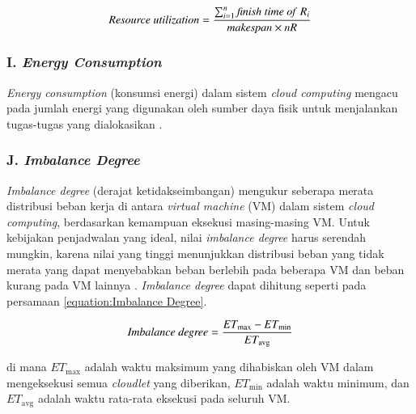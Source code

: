 \begin{equation}
\label{equation:Resource Utilization}
    \text{\textit{Resource utilization}} = \frac{\sum_{i=1}^{n} \text{\textit{finish time of} } R_i}{\text{\textit{makespan}} \times nR}
\end{equation}

\subsubsection{I. \textit{Energy Consumption}}
\textit{Energy consumption} (konsumsi energi) dalam sistem \textit{cloud computing} mengacu pada jumlah energi yang digunakan oleh sumber daya fisik untuk menjalankan tugas-tugas yang dialokasikan \parencite{Emara2021}.

\subsubsection{J. \textit{Imbalance Degree}}
\textit{Imbalance degree} (derajat ketidakseimbangan) mengukur seberapa merata distribusi beban kerja di antara \textit{virtual machine} (VM) dalam sistem \textit{cloud computing}, berdasarkan kemampuan eksekusi masing-masing VM. Untuk kebijakan penjadwalan yang ideal, nilai \textit{imbalance degree} harus serendah mungkin, karena nilai yang tinggi menunjukkan distribusi beban yang tidak merata yang dapat menyebabkan beban berlebih pada beberapa VM dan beban kurang pada VM lainnya \parencite{Tomar2022}. \textit{Imbalance degree} dapat dihitung seperti pada persamaan \ref{equation:Imbalance Degree}.

\begin{equation}
\label{equation:Imbalance Degree}
    \text{\textit{Imbalance degree}} = \frac{ET_{\max} - ET_{\min}}{ET_{\text{avg}}}
\end{equation}

di mana $ET_{\max}$ adalah waktu maksimum yang dihabiskan oleh VM dalam mengeksekusi semua \textit{cloudlet} yang diberikan, $ET_{\min}$ adalah waktu minimum, dan $ET_{\text{avg}}$ adalah waktu rata-rata eksekusi pada seluruh VM.